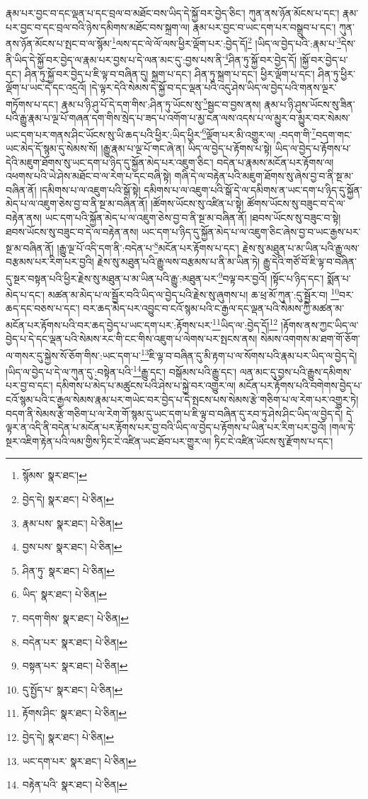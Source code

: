 རྣམ་པར་བྱང་བ་དང་ལྡན་པ་དང་བྲལ་བ་མཐོང་བས་ཡིད་དེ་སྐྱོ་བར་བྱེད་ཅིང་། ཀུན་ནས་ཉོན་མོངས་པ་དང་། རྣམ་པར་བྱང་བ་དང་བྲལ་བའི་ཉེས་དམིགས་མཐོང་བས་སྐྲག་ལ། རྣམ་པར་བྱང་བ་ཡང་དག་པར་བསྒྲུབ་པ་དང་། ཀུན་ནས་ཉོན་མོངས་པ་སྤང་བ་ལ་སྙོམ་\footnote{སྙོམས་  སྣར་ཐང་། }ལས་དང་ལེ་ལོ་ལས་ཕྱིར་ལྡོག་པར་:བྱེད་དོ།\footnote{བྱེད་དེ།  སྣར་ཐང་།  པེ་ཅིན། } །ཡིད་ལ་བྱེད་པའི་:རྣམ་པ་\footnote{རྣམ་པས་  སྣར་ཐང་།  པེ་ཅིན། }དེས་ནི་ཡིད་དེ་སྐྱོ་བར་བྱེད་ལ་རྣམ་པར་བྱས་པ་དེ་ལན་མང་དུ་:བྱས་པས་ནི་\footnote{བྱས་པས་  སྣར་ཐང་།  པེ་ཅིན། }ཤིན་ཏུ་སྐྱོ་བར་བྱེད་དོ། །སྐྱོ་བར་བྱེད་པ་དང་། ཤིན་ཏུ་སྐྱོ་བར་བྱེད་པ་ཇི་ལྟ་བ་བཞིན་དུ། སྐྲག་པ་དང་། ཤིན་ཏུ་སྐྲག་པ་དང་། ཕྱིར་ལྡོག་པ་དང་། ཤིན་ཏུ་ཕྱིར་ལྡོག་པ་ཡང་དེ་དང་འདྲའོ། །དེ་ལྟར་དེའི་སེམས་དེ་སྐྱོ་བ་དང་ལྡན་པའི་འདུ་ཤེས་ཡིད་ལ་བྱེད་པའི་གནས་ལྔར་གཏོགས་པ་དང་། རྣམ་པ་ཉི་ཤུ་པོ་དེ་དག་གིས་:ཤིན་ཏུ་ཡོངས་སུ་\footnote{ཤིན་ཏུ་  སྣར་ཐང་།  པེ་ཅིན། }སྦྱང་བ་བྱས་ནས། རྣམ་པ་ཉི་ཤུས་ཡོངས་སུ་ཟིན་པའི་རྒྱུ་རྣམ་པ་ལྔ་པོ་གཞན་དག་གིས་སྲེད་པ་ཟད་པ་འགོག་པ་མྱ་ངན་ལས་འདས་པ་ལ་མྱུར་བ་མྱུར་བར་སེམས་ཡང་དག་པར་གནས་ཤིང་ཡོངས་སུ་ཡི་ཆད་པའི་ཕྱིར་:ཡིད་ཕྱིར་\footnote{ཡིད་  སྣར་ཐང་།  པེ་ཅིན། }ལྡོག་པར་མི་འགྱུར་ལ། :བདག་གི་\footnote{བདག་གིས་  སྣར་ཐང་།  པེ་ཅིན། }བདག་གང་ཡང་མེད་དོ་སྙམ་དུ་སེམས་སོ། །རྒྱུ་རྣམ་པ་ལྔ་པོ་གང་ཞེ་ན། ཡིད་ལ་བྱེད་པ་རྟོགས་པ་སྟེ། ཡིད་ལ་བྱེད་པ་རྟོགས་པ་དེའི་མཇུག་ཐོགས་སུ་ཡང་དག་པ་ཉིད་དུ་སྐྱོན་མེད་པར་འཇུག་ཅིང་། བདེན་པ་རྣམས་མངོན་པར་རྟོགས་ལ། འཕགས་པའི་ཡེ་ཤེས་མཐོང་བ་ལ་རེག་པ་དང་བཞི་སྟེ། གཞི་དེ་ལ་བརྟེན་པའི་མཇུག་ཐོགས་སུ་ཞེས་བྱ་བ་ནི་སྔ་མ་བཞིན་ནོ། །དམིགས་པ་ལ་འཇུག་པའི་སྒོ་སྟེ། དམིགས་པ་ལ་འཇུག་པའི་སྒོ་དེ་ལ་དམིགས་ན་ཡང་དག་པ་ཉིད་དུ་སྐྱོན་མེད་པ་ལ་འཇུག་ཅེས་བྱ་བ་ནི་སྔ་མ་བཞིན་ནོ། །ཚོགས་ཡོངས་སུ་འཛིན་པ་སྟེ། ཚོགས་ཡོངས་སུ་བཟུང་བ་དེ་ལ་བརྟེན་ནས། ཡང་དག་པའི་སྐྱོན་མེད་པ་ལ་འཇུག་ཅེས་བྱ་བ་ནི་སྔ་མ་བཞིན་ནོ། །ཐབས་ཡོངས་སུ་བཟུང་བ་སྟེ། ཐབས་ཡོངས་སུ་བཟུང་བ་དེ་ལ་བརྟེན་ནས། ཡང་དག་པ་ཉིད་དུ་སྐྱོན་མེད་པ་ལ་འཇུག་ཅིང་ཞེས་བྱ་བ་ཡང་རྒྱས་པར་སྔ་མ་བཞིན་ནོ། །རྒྱུ་ལྔ་པོ་འདི་དག་ནི་:བདེན་པ་\footnote{བདེན་པར་  སྣར་ཐང་།  པེ་ཅིན། }མངོན་པར་རྟོགས་པ་དང་། རྗེས་སུ་མཐུན་པ་མ་ཡིན་པའི་རྒྱུ་ལས་བརྩམས་པར་རིག་པར་བྱའི། རྗེས་སུ་མཐུན་པའི་རྒྱུ་ལས་བརྩམས་པ་ནི་མ་ཡིན་ཏེ། རྒྱུ་དེའི་གཙོ་བོ་ཇི་ལྟ་བ་བཞིན་དུ་སྔར་བསྟན་པའི་ཕྱིར་རྗེས་སུ་མཐུན་པ་མ་ཡིན་པའི་རྒྱུ་:མཐུན་པར་\footnote{བསྟན་པར་  སྣར་ཐང་།  པེ་ཅིན། }བལྟ་བར་བྱའོ། །སྟོང་པ་ཉིད་དང་། སྨོན་པ་མེད་པ་དང་། མཚན་མ་མེད་པ་ལ་སྦྱོར་བའི་ཡིད་ལ་བྱེད་པའི་རྗེས་སུ་ཞུགས་པ། ཆ་ཕྲ་མོ་ཀུན་:དུ་སྦྱོར་བ། \footnote{དུ་སྤྱོད་པ་  སྣར་ཐང་།  པེ་ཅིན། }བར་ཆད་དང་བཅས་པ་དང་། བར་ཆད་མེད་པར་འབྱུང་བ་ངའོ་སྙམ་པའི་ང་རྒྱལ་དང་ལྡན་པའི་སེམས་ཀྱི་མཚན་མ་མངོན་པར་རྟོགས་པའི་བར་ཆད་བྱེད་པ་ཡང་དག་པར་:རྟོགས་པར་\footnote{རྟོགས་ཤིང་  སྣར་ཐང་།  པེ་ཅིན། }ཡིད་ལ་:བྱེད་དོ།\footnote{བྱེད་དེ།  སྣར་ཐང་།  པེ་ཅིན། } །རྟོགས་ནས་ཀྱང་ཡིད་ལ་བྱེད་པ་དེ་དང་ལྡན་པའི་སེམས་རང་གི་ངང་གིས་འཇུག་པ་ལེགས་པར་སྤངས་ནས། སེམས་འགགས་མ་ཐག་གོ་ཅོག་ལ་གསར་དུ་སྐྱེས་སོ་ཅོག་གིས་:ཡང་དག་པ་\footnote{ཡང་དག་པར་  སྣར་ཐང་།  པེ་ཅིན། }ཇི་ལྟ་བ་བཞིན་དུ་མི་རྟག་པ་ལ་སོགས་པའི་རྣམ་པར་ཡིད་ལ་བྱེད་དེ། །ཡིད་ལ་བྱེད་པ་དེ་ལ་ཀུན་དུ་:བསྟེན་པའི་\footnote{བརྟེན་པའི་  སྣར་ཐང་།  པེ་ཅིན། }རྒྱུ་དང་། བསྒོམས་པའི་རྒྱུ་དང་། ལན་མང་དུ་བྱས་པའི་རྒྱུས་དམིགས་པར་བྱ་བ་དང་། དམིགས་པ་མེད་པ་མཚུངས་པའི་ཤེས་པ་སྐྱེ་བར་འགྱུར་ལ། མངོན་པར་རྟོགས་པའི་བགེགས་བྱེད་པ་ངའོ་སྙམ་པའི་ང་རྒྱལ་སེམས་རྣམ་པར་གཡེང་བར་བྱེད་པ་དེ་སྤངས་པས་སེམས་རྩེ་གཅིག་པ་ལ་རེག་པར་འགྱུར་ཏེ། བདག་ནི་སེམས་རྩེ་གཅིག་པ་ལ་རེག་གོ་སྙམ་དུ་ཡང་དག་པ་ཇི་ལྟ་བ་བཞིན་དུ་རབ་ཏུ་ཤེས་ཤིང་ཡིད་ལ་བྱེད་དེ། དེ་ལྟར་ན་འདི་ནི་བདེན་པ་མངོན་པར་རྟོགས་པར་བྱ་བའི་ཡིད་ལ་བྱེད་པ་རྟོགས་པ་ཡིན་པར་རིག་པར་བྱའོ། །གལ་ཏེ་སྔར་འཇིག་རྟེན་པའི་ལམ་གྱིས་ཏིང་ངེ་འཛིན་ཡང་ཐོབ་པར་གྱུར་ལ། ཏིང་ངེ་འཛིན་ཡོངས་སུ་རྫོགས་པ་དང་། 